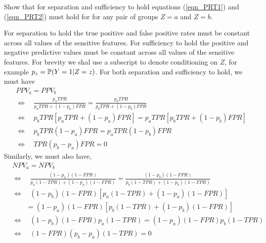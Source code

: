 \begin{lookbox}
Show that for separation and sufficiency to hold equations (\ref{eqn_PRT1}) and (\ref{eqn_PRT2}) must hold for  for any pair of groups $Z=a$ and $Z=b$.
\end{lookbox}

For separation to hold the true positive and false positive rates must be constant across all values of the sensitive features. For sufficiency to hold the positive and negative predictive values must be constant across all values of the sensitive features. For brevity we shal use a subscript to denote conditioning on $Z$, for example $p_z=\mathbb{P}(Y=1|Z=z)$. For both separation and sufficiency to hold, we must have
%
\begin{align}
& PPV_a  = PPV_b \nonumber \\
& \Leftrightarrow\quad \frac{p_a TPR}{p_a TPR + (1-p_a)FPR}
                     = \frac{p_b TPR}{p_b TPR + (1-p_b)FPR} \nonumber \\
& \Leftrightarrow\quad p_b TPR[p_a TPR + (1-p_a)FPR]
                     = p_a TPR[p_b TPR + (1-p_b)FPR] \nonumber \\
&\Leftrightarrow\quad p_b TPR(1-p_a)FPR
                    = p_a TPR(1-p_b)FPR \nonumber \\
&\Leftrightarrow\quad TPR(p_b-p_a)FPR = 0 \label{eqn_PPV-SepSuf}
\end{align}
%
Similarly, we must also have,
%
\begin{align}
& NPV_a = NPV_b \nonumber \\
& \Leftrightarrow\quad
  \frac{(1-p_a)(1-FPR)}{p_a(1-TPR) + (1-p_a)(1-FPR)}
= \frac{(1-p_b)(1-FPR)}{p_b(1-TPR) + (1-p_b)(1-FPR)} \nonumber \\
& \Leftrightarrow\quad
           (1-p_b)(1-FPR)[p_a(1-TPR) + (1-p_a)(1-FPR)] \nonumber \\
& \qquad = (1-p_a)(1-FPR)[p_b(1-TPR) + (1-p_b)(1-FPR)] \nonumber \\
& \Leftrightarrow\quad
  (1-p_b)(1-FPR)p_a(1-TPR)
= (1-p_a)(1-FPR)p_b(1-TPR) \nonumber \\
& \Leftrightarrow\quad
  (1-FPR)(p_b-p_a)(1-TPR) = 0 \label{eqn_NPV-SepSuf}
\end{align}